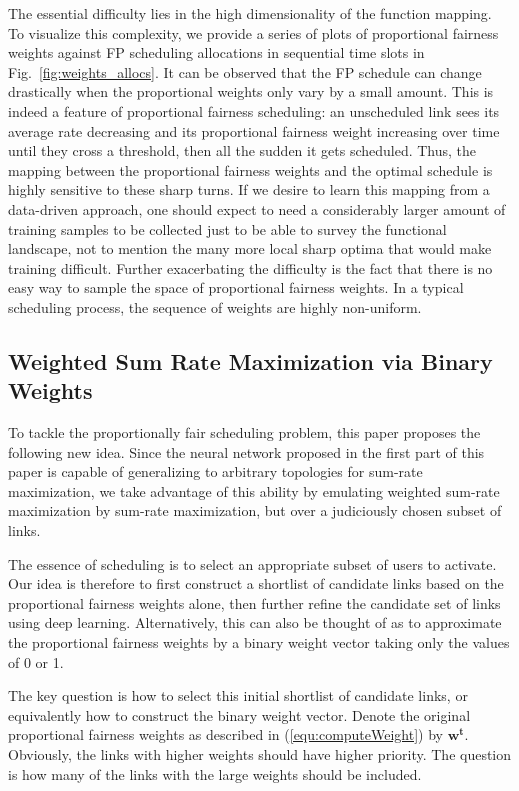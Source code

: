 \documentclass[journal,12pt,onecolumn,draftclsnofoot,]{IEEEtran}
\begin{document}
The essential difficulty lies in the high dimensionality of the function mapping. 
To visualize this complexity, we provide a series of plots of proportional
fairness weights against FP scheduling allocations in sequential time slots in
Fig.~\ref{fig:weights_allocs}. It can be observed that the FP schedule can change drastically when the proportional weights only vary by a small amount. This is indeed a feature of proportional fairness
scheduling: an unscheduled link sees its average rate decreasing and its
proportional fairness weight increasing over time until they cross a threshold,
then all the sudden it gets scheduled. Thus, the mapping between the
proportional fairness weights and the optimal schedule is highly sensitive to
these sharp turns. If we desire to learn this mapping from a data-driven approach, one should
expect to need a considerably larger amount of training samples to be collected
just to be able to survey the functional landscape, not to mention the many
more local sharp optima that would make training difficult. Further exacerbating
the difficulty is the fact that there is no easy way to sample the space of
proportional fairness weights. In a typical scheduling process, the sequence of
weights are highly non-uniform. 


\subsection{Weighted Sum Rate Maximization via Binary Weights} \label{sec:stepByStepSumRate}

To tackle the proportionally fair scheduling problem, this paper proposes
the following new idea. Since the neural network proposed in the first
part of this paper is capable of generalizing to arbitrary topologies for
sum-rate maximization, we take advantage of this ability by emulating weighted
sum-rate maximization by sum-rate maximization, but over a judiciously chosen
subset of links.

The essence of scheduling is to select an appropriate subset of users to activate.
Our idea is therefore to first construct a shortlist of candidate links based on the
proportional fairness weights alone, then further refine the candidate set of
links using deep learning. Alternatively, this can also be thought of as to
approximate the proportional fairness weights by a binary weight vector 
taking only the values of 0 or 1.

The key question is how to select this initial shortlist of candidate links,
or equivalently how to construct the binary weight vector.  Denote the original
proportional fairness weights as described in (\ref{equ:computeWeight}) by
$\mathbf{w^t}$. Obviously, the links with higher weights should have higher priority. The
question is how many of the links with the large weights should be included.
\end{document}
